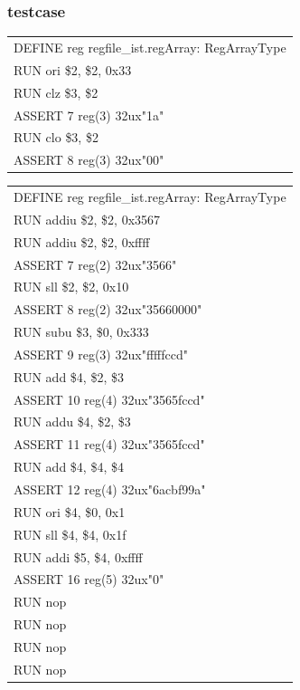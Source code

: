 \documentclass[11pt,utf8]{article}
\begin{document}
{{\subsubsection{testcase} {
\begin{center}	\begin{longtable}{p{15cm}} \hline
		DEFINE{ }reg{ }regfile\_ist.regArray:{ }RegArrayType\\
		RUN{ }ori{ }\$2,{ }\$2,{ }0x33\\
		RUN{ }clz{ }\$3,{ }\$2\\
		ASSERT{ }7{ }reg(3){ }32ux"1a"\\
		RUN{ }clo{ }\$3,{ }\$2\\
		ASSERT{ }8{ }reg(3){ }32ux"00"\\
		\hline \end{longtable} \end{center}
\begin{center}	\begin{longtable}{p{15cm}} \hline
		DEFINE{ }reg{ }regfile\_ist.regArray:{ }RegArrayType\\
		RUN{ }addiu{ }\$2,{ }\$2,{ }0x3567\\
		RUN{ }addiu{ }\$2,{ }\$2,{ }0xffff\\
		ASSERT{ }7{ }reg(2){ }32ux"3566"\\
		RUN{ }sll{ }\$2,{ }\$2,{ }0x10\\
		ASSERT{ }8{ }reg(2){ }32ux"35660000"\\
		RUN{ }subu{ }\$3,{ }\$0,{ }0x333\\
		ASSERT{ }9{ }reg(3){ }32ux"fffffccd"\\
		RUN{ }add{ }\$4,{ }\$2,{ }\$3\\
		ASSERT{ }10{ }reg(4){ }32ux"3565fccd"\\
		RUN{ }addu{ }\$4,{ }\$2,{ }\$3\\
		ASSERT{ }11{ }reg(4){ }32ux"3565fccd"\\
		RUN{ }add{ }\$4,{ }\$4,{ }\$4\\
		ASSERT{ }12{ }reg(4){ }32ux"6acbf99a"\\
		RUN{ }ori{ }\$4,{ }\$0,{ }0x1\\
		RUN{ }sll{ }\$4,{ }\$4,{ }0x1f\\
		RUN{ }addi{ }\$5,{ }\$4,{ }0xffff\\
		ASSERT{ }16{ }reg(5){ }32ux"0"\\
		RUN{ }nop\\
		RUN{ }nop\\
		RUN{ }nop\\
		RUN{ }nop\\

\end{longtable}
\end{center}}}}
\end{document}
